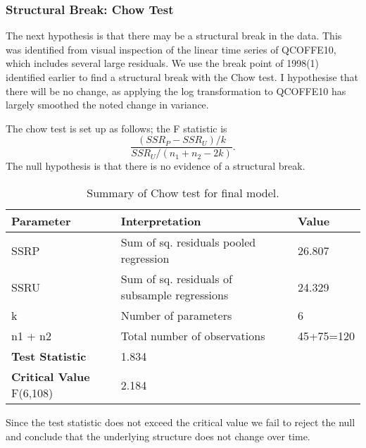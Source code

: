 \documentclass[12pt]{article}
\begin{document}
\subsubsection{Structural Break: Chow Test} %
\label{ssub:structural_break}
The next hypothesis is that there may be a structural break in the data. This was identified from visual inspection of the linear time series of QCOFFE10, which includes several large residuals. We use the break point of 1998(1) identified earlier to find a structural break with the Chow test. I hypothesise that there will be no change, as applying the log transformation to QCOFFE10 has largely smoothed the noted change in variance.

The chow test is set up as follows; the F statistic is 
\[
\frac{(SSR_P-SSR_U)/k}{SSR_U / (n_1+n_2-2k)}.
\]
The null hypothesis is that there is no evidence of a structural break.

 \begin{table}[!htb]\caption{\label{tb:chow} Summary of Chow test for final model.}
    \begin{tabular}{lll}
    \textbf{Parameter}               & \textbf{Interpretation}                                & \textbf{Value}     \\\hline\hline
    SSRP                    & Sum of sq. residuals pooled  regression       & 26.807    \\
    SSRU                    & Sum of sq. residuals of subsample regressions & 24.329    \\
    k                       & Number of parameters                          & 6         \\
    n1 + n2                 & Total number of observations                  & 45+75=120 \\ \hline
    \textbf{Test Statistic}          & 1.834                                         & ~         \\
    \textbf{Critical Value} F(6,108) & 2.184                                      & ~         \\
    \end{tabular}
\end{table} %
Since the test statistic does not exceed the critical value we fail to reject the null and conclude that the underlying structure does not change over time.
\end{document}
